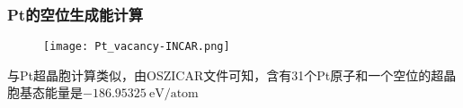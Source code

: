 \frame
{
	\frametitle{\textrm{Pt}的空位生成能计算}
\begin{figure}[h!]
\centering
\texttt{[image: Pt\_vacancy-INCAR.png]}
\caption{\fontsize{6.2pt}{5.2pt}}%
\label{Pt_Bulk-INCAR-modified}
\end{figure}
与\textrm{Pt}超晶胞计算类似，由\textrm{OSZICAR}文件可知，含有31个\textrm{Pt}原子和一个空位的超晶胞基态能量是$-186.95325\mathrm{~eV/atom}$
}

